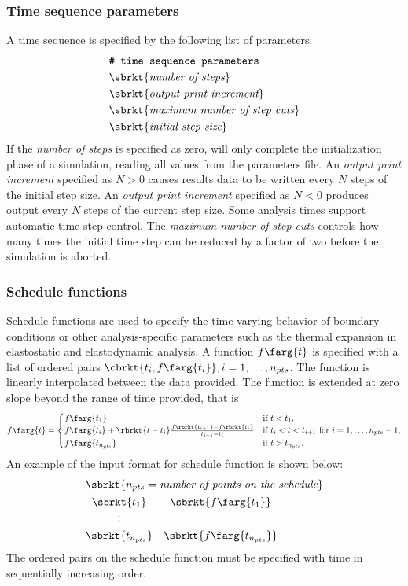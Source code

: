 \subsubsection{Time sequence parameters}
\label{sect.tseq.param}
A time sequence is specified by the following list of parameters:
\begin{align}
& \texttt{\# time sequence parameters} \notag \\
& \sbrkt{\textit{number of steps}} \notag \\
& \sbrkt{\textit{output print increment}} \notag \\
& \sbrkt{\textit{maximum number of step cuts}} \notag \\
& \sbrkt{\textit{initial step size}} \notag
\end{align}
If the \textit{number of steps} is specified as zero, \tahoe will only 
complete the initialization phase of a simulation, reading all 
values from the parameters file. An \textit{output print increment}
specified as $N > 0$ causes results data to be written 
every $N$ steps of the initial step size.
An \textit{output print increment}
specified as $N < 0$ produces output every $N$ steps of the current step size.
Some analysis times support automatic time step control. The 
\textit{maximum number of step cuts} controls how many times the 
initial time step can be reduced by a factor of two before the 
simulation is aborted.

\subsubsection{Schedule functions}
\label{sect.sched.param}
Schedule functions are used to specify the time-varying behavior of 
boundary conditions or other analysis-specific parameters such as the 
thermal expansion in elastostatic and elastodynamic analysis. A
function $f\farg{t}$ is specified with a list of
ordered pairs $\cbrkt{t_{i}, f\farg{t_{i}}}, i=1,\ldots,n_{pts}$. 
The function is linearly interpolated between the data provided. 
The function is extended at zero slope beyond the range of time 
provided, that is
\[
f\farg{t} =
\begin{cases}
f\farg{t_{1}} & \textrm{if~} t < t_{1}, \\
f\farg{t_{i}} + \rbrkt{t - t_{i}} 
\frac{f\rbrkt{t_{i+1}} - f\rbrkt{t_{i}}}{t_{i+1} - t_{i}} & 
\textrm{if~} t_{i} < t <  t_{i+1} \textrm{~for~} i=1,\ldots,n_{pts}-1, \\
f\farg{t_{n_{pts}}} & \textrm{if~}t > t_{n_{pts}}.
\end{cases}	
\]
An example of the input format for schedule function is shown below:
\begin{align}
& \sbrkt{n_{pts} = \textit{number of points on the schedule}} \notag \\
& \begin{matrix}
\sbrkt{t_{1}} & \sbrkt{f\farg{t_{1}}} \\
\vdots \\
\sbrkt{t_{n_{pts}}} & \sbrkt{f\farg{t_{n_{pts}}}}
\end{matrix} \notag
\end{align}
The ordered pairs on the schedule function must be specified with 
time in sequentially increasing order.
